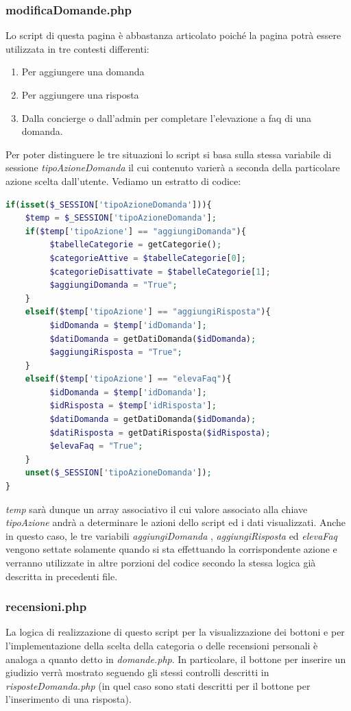 \documentclass [a4paper, 12pt]{book}
\begin{document}
\subsubsection{modificaDomande.php}
Lo script di questa pagina è abbastanza articolato poiché la pagina potrà essere utilizzata in tre contesti differenti:
\begin{enumerate}
\item Per aggiungere una domanda
\item Per aggiungere una risposta
\item Dalla concierge o dall'admin per completare l'elevazione a faq di una domanda.
\end{enumerate}
Per poter distinguere le tre situazioni lo script si basa sulla stessa variabile di sessione \textit{tipoAzioneDomanda} il cui contenuto varierà a seconda della particolare azione scelta dall'utente. Vediamo un estratto di codice:
\begin{lstlisting}[style=XML , language=PHP]
if(isset($_SESSION['tipoAzioneDomanda'])){
    $temp = $_SESSION['tipoAzioneDomanda'];
    if($temp['tipoAzione'] == "aggiungiDomanda"){            
         $tabelleCategorie = getCategorie();
         $categorieAttive = $tabelleCategorie[0];
         $categorieDisattivate = $tabelleCategorie[1];  
         $aggiungiDomanda = "True";
    }
    elseif($temp['tipoAzione'] == "aggiungiRisposta"){
         $idDomanda = $temp['idDomanda'];
         $datiDomanda = getDatiDomanda($idDomanda);
         $aggiungiRisposta = "True";
    }
    elseif($temp['tipoAzione'] == "elevaFaq"){
         $idDomanda = $temp['idDomanda'];
         $idRisposta = $temp['idRisposta'];
         $datiDomanda = getDatiDomanda($idDomanda);
         $datiRisposta = getDatiRisposta($idRisposta);
         $elevaFaq = "True";
    }
    unset($_SESSION['tipoAzioneDomanda']);
}	
\end{lstlisting}
\textit{temp} sarà dunque un array associativo il cui valore associato alla chiave \textit{tipoAzione} andrà a determinare le azioni dello script ed i dati visualizzati. Anche in questo caso, le tre variabili \textit{aggiungiDomanda} , \textit{aggiungiRisposta} ed \textit{elevaFaq} vengono settate solamente quando si sta effettuando la corrispondente azione e verranno utilizzate in altre porzioni del codice secondo la stessa logica già descritta in precedenti file.

\subsubsection{recensioni.php}
La logica di realizzazione di questo script per la visualizzazione dei bottoni e per l'implementazione della scelta della categoria o delle recensioni personali è analoga a quanto detto in \textit{domande.php}. In particolare, il bottone per inserire un giudizio verrà mostrato seguendo gli stessi controlli descritti in \textit{risposteDomanda.php} (in quel caso sono stati descritti per il bottone per l'inserimento di una risposta).
\end{document}
